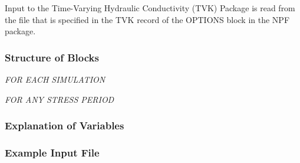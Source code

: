 Input to the Time-Varying Hydraulic Conductivity (TVK) Package is read from the file that is specified in the TVK record of the OPTIONS block in the NPF package.

\vspace{5mm}
\subsubsection{Structure of Blocks}
\vspace{5mm}

\noindent \textit{FOR EACH SIMULATION}

\vspace{5mm}
\noindent \textit{FOR ANY STRESS PERIOD}


\vspace{5mm}
\subsubsection{Explanation of Variables}
\begin{description}

\end{description}

\vspace{5mm}
\subsubsection{Example Input File}

